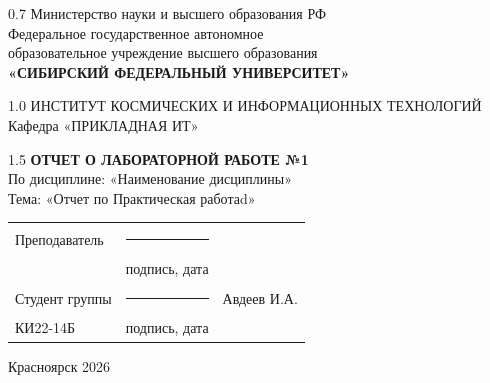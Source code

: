 \begin{titlepage}
	\begin{center}
		\begin{spacing}{0.7}
		Министерство науки и высшего образования РФ\\
		{\small Федеральное государственное автономное}\\
		{\small образовательное учреждение высшего образования}\\
		\textbf{\small«СИБИРСКИЙ ФЕДЕРАЛЬНЫЙ УНИВЕРСИТЕТ»}\\
		\end{spacing}
		
		\vfill
		
		\begin{spacing}{1.0}
		ИНСТИТУТ КОСМИЧЕСКИХ И ИНФОРМАЦИОННЫХ ТЕХНОЛОГИЙ\\
		Кафедра «ПРИКЛАДНАЯ ИТ»\\
		\end{spacing}
		
		\vfill
		\vfill
		
		\begin{spacing}{1.5}
			\textbf{\large ОТЧЕТ О ЛАБОРАТОРНОЙ РАБОТЕ №1}\\[5mm]
			По дисциплине: «Наименование дисциплины»\\[3mm]
			Тема: «Отчет по Практическая работаd»
		\end{spacing}
    \end{center}		

	\vfill
	\vfill
	
\noindent
\begin{tabular}{@{} p{} p{} p{} @{}}
	Преподаватель    & \rule{3.5cm}{.1pt} &   \\
	                 & {\scriptsize подпись, дата} & \\ [4ex]
	Студент группы   & \rule{3.5cm}{.1pt} & Авдеев И.А. \\
	КИ22-14Б & {\scriptsize подпись, дата} & \\
\end{tabular}

\vfill
\begin{center}Красноярск 2026\end{center}
\end{titlepage}
\restoregeometry